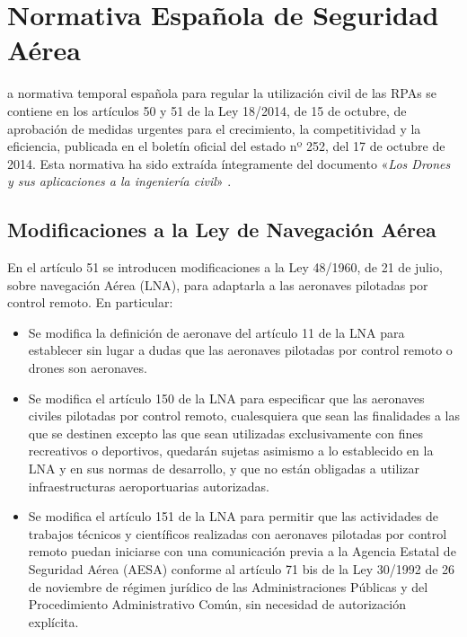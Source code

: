 \chapter{Normativa Española de Seguridad Aérea}
\label{chap:normativa}

a normativa temporal española para regular la utilización civil de las \acs{RPA}s se contiene en los artículos 50 y 51 de la Ley 18/2014, de 15 de octubre, de aprobación de medidas urgentes para el crecimiento, la competitividad y la eficiencia, publicada en el boletín oficial del estado nº 252, del 17 de octubre de 2014. Esta normativa ha sido extraída íntegramente del documento «\textit{Los Drones y sus aplicaciones a la ingeniería civil}» \cite{normativa}.  

\section{Modificaciones a la Ley de Navegación Aérea}

En el artículo 51 se introducen modificaciones a la Ley 48/1960, de 21 de julio, sobre navegación Aérea (\acs{LNA}), para adaptarla a las aeronaves pilotadas por control remoto. En particular:

\begin{itemize}
\item Se modifica la definición de aeronave del artículo 11 de la \acs{LNA} para establecer sin lugar a dudas que las aeronaves pilotadas por control remoto o drones son aeronaves.
\item Se modifica el artículo 150 de la \acs{LNA} para especificar que las aeronaves civiles pilotadas por control remoto, cualesquiera que sean las finalidades a las que se destinen excepto las que sean utilizadas exclusivamente con fines recreativos o deportivos, quedarán sujetas asimismo a lo establecido en la \acs{LNA} y en sus normas de desarrollo, y que no están obligadas a utilizar infraestructuras aeroportuarias autorizadas.
\item Se modifica el artículo 151 de la \acs{LNA} para permitir que las actividades de trabajos técnicos y científicos realizadas
con aeronaves pilotadas por control remoto puedan iniciarse con una comunicación previa a la Agencia Estatal de Seguridad Aérea (AESA) conforme al artículo 71 bis de la Ley 30/1992 de 26 de noviembre de régimen jurídico de las Administraciones Públicas y del Procedimiento Administrativo Común, sin necesidad de autorización explícita.
\end{itemize}

